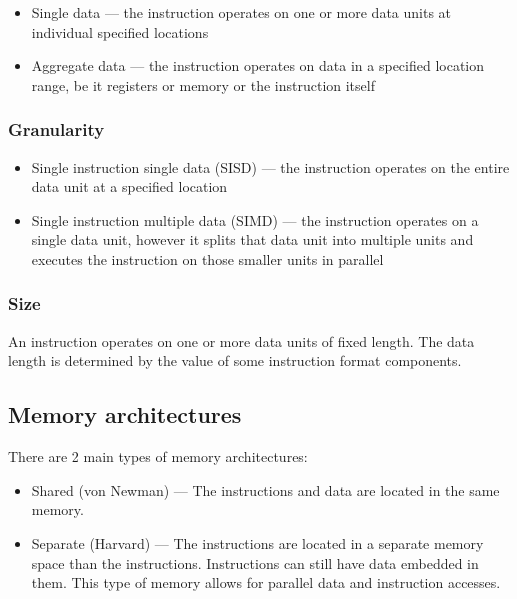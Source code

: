 \documentclass{report}
\begin{document}
\begin{itemize}
    \item{Single data --- the instruction operates on one or more data units at
        individual specified locations}
    \item{Aggregate data --- the instruction operates on data in a specified
        location range, be it registers or memory or the instruction itself}
\end{itemize}

\subsubsection{Granularity}

\begin{itemize}
    \item{Single instruction single data (SISD) --- the instruction operates on
        the entire data unit at a specified location}
    \item{Single instruction multiple data (SIMD) --- the instruction operates on
        a single data unit, however it splits that data unit into multiple units
        and executes the instruction on those smaller units in parallel}
\end{itemize}

\subsubsection{Size}

An instruction operates on one or more data units of fixed length. The data
length is determined by the value of some instruction format components.

\subsection{Memory architectures}

There are 2 main types of memory architectures:

\begin{itemize}
    \item{Shared (von Newman) --- The instructions and data are located in the
        same memory.}
    \item{Separate (Harvard) --- The instructions are located in a separate
        memory space than the instructions. Instructions can still have data
        embedded in them. This type of memory allows for parallel data and
        instruction accesses. }
\end{itemize}
\end{document}
